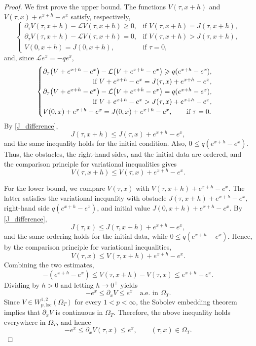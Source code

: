 \documentclass[11pt, a4paper, leqno]{amsart}
\numberwithin{equation}{section}
\theoremstyle{plain}
\theoremstyle{definition}
\theoremstyle{remark}
\def\leq{\leqslant}
\def\geq{\geqslant}
\begin{document}
{\begin{proof}
We first prove the upper bound.
The functions $V(\tau,x+h)$ and
$V(\tau,x)+e^{x+h}-e^x$ satisfy, respectively,
\[
\begin{cases}
\partial_\tau V(\tau,x+h)-\mathcal LV(\tau,x+h)\geq0,
&\text{if }V(\tau,x+h)=J(\tau,x+h),\\
\partial_\tau V(\tau,x+h)-\mathcal LV(\tau,x+h)=0,
&\text{if }V(\tau,x+h)>J(\tau,x+h),\\
V(0,x+h)=J(0,x+h),&\text{if }\tau=0,
\end{cases}
\]
and, since $\mathcal Le^x=-qe^x$,
\[
\begin{cases}
\partial_\tau\!\left(V+e^{x+h}-e^x\right)
-\mathcal L\!\left(V+e^{x+h}-e^x\right)
\geq q(e^{x+h}-e^x),
\\
\hfill
\text{if }V+e^{x+h}-e^x
=J(\tau,x)+e^{x+h}-e^x,
\\
\partial_\tau\!\left(V+e^{x+h}-e^x\right)
-\mathcal L\!\left(V+e^{x+h}-e^x\right)
=q(e^{x+h}-e^x),
\\
\hfill
\text{if }V+e^{x+h}-e^x
>J(\tau,x)+e^{x+h}-e^x,
\\
V(0,x)+e^{x+h}-e^x
=J(0,x)+e^{x+h}-e^x,
\qquad \text{if }\tau=0.
\end{cases}
\]
By \eqref{J_difference},
\[
    J(\tau,x+h)
    \leq J(\tau,x)+e^{x+h}-e^x,
\]
and the same inequality holds for the initial condition.
Also, $0\leq q(e^{x+h}-e^x)$.
Thus, the obstacles, the right-hand sides, and the initial data
are ordered, and the comparison principle for variational inequalities \cite[Theorem 1.2]{YY08}
gives
\[
    V(\tau,x+h)
    \leq V(\tau,x)+e^{x+h}-e^x.
\]

For the lower bound, we compare $V(\tau,x)$ with
$V(\tau,x+h)+e^{x+h}-e^x$.
The latter satisfies the variational inequality with obstacle
$J(\tau,x+h)+e^{x+h}-e^x$, right-hand side
$q(e^{x+h}-e^x)$, and initial value
$J(0,x+h)+e^{x+h}-e^x$.
By \eqref{J_difference},
\[
    J(\tau,x)
    \leq J(\tau,x+h)+e^{x+h}-e^x,
\]
and the same ordering holds for the initial data, while
$0\leq q(e^{x+h}-e^x)$.
Hence, by the comparison principle for variational inequalities,
\[
    V(\tau,x)
    \leq V(\tau,x+h)+e^{x+h}-e^x.
\]
Combining the two estimates,
\[
    -(e^{x+h}-e^x)
    \leq V(\tau,x+h)-V(\tau,x)
    \leq e^{x+h}-e^x.
\]
Dividing by $h>0$ and letting $h\to0^+$ yields
\[
    -e^x\leq\partial_xV\leq e^x
    \quad\text{a.e. in }\Omega_T.
\]
Since $V\in W^{1,2}_{p,\mathrm{loc}}(\Omega_T)$ for every
$1<p<\infty$, the Sobolev embedding theorem implies that
$\partial_xV$ is continuous in $\Omega_T$. Therefore, the above
inequality holds everywhere in $\Omega_T$, and hence
\[
    -e^x\leq\partial_xV(\tau,x)\leq e^x,
    \qquad (\tau,x)\in\Omega_T.
\]
\end{proof}
}
\end{document}
